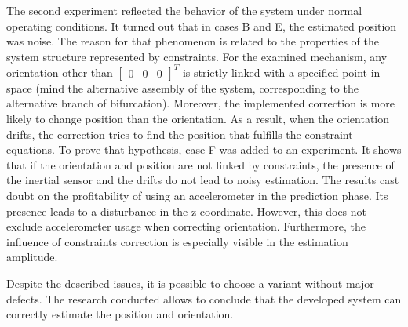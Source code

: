 The second experiment reflected the behavior of the system under normal operating conditions. It turned out that in cases B and E, the estimated position was noise. The reason for that phenomenon is related to the properties of the system structure represented by constraints. For the examined mechanism, any orientation other than $\begin{bmatrix}0 & 0 & 0 \end{bmatrix}^T$ is strictly linked with a specified point in space (mind the alternative assembly of the system, corresponding to the alternative branch of bifurcation). Moreover, the implemented correction is more likely to change position than the orientation. As a result, when the orientation drifts, the correction tries to find the position that fulfills the constraint equations. To prove that hypothesis, case F was added to an experiment. It shows that if the orientation and position are not linked by constraints, the presence of the inertial sensor and the drifts do not lead to noisy estimation. The results cast doubt on the profitability of using an accelerometer in the prediction phase. Its presence leads to a disturbance in the z coordinate. However, this does not exclude accelerometer usage when correcting orientation. Furthermore, the influence of constraints correction is especially visible in the estimation amplitude.
  
Despite the described issues, it is possible to choose a variant without major defects.
The research conducted allows to conclude that the developed system can correctly estimate the position and orientation. 



